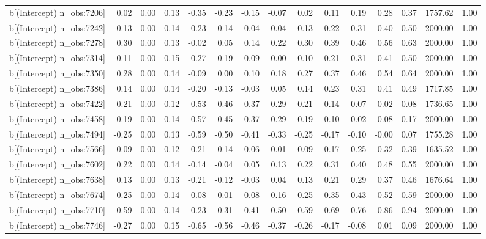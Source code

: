 \begin{table}[ht]
\begin{tabular}{rrrrrrrrrrrrrrr}
  b[(Intercept) n\_obs:7206] & 0.02 & 0.00 & 0.13 & -0.35 & -0.23 & -0.15 & -0.07 & 0.02 & 0.11 & 0.19 & 0.28 & 0.37 & 1757.62 & 1.00 \\ 
  b[(Intercept) n\_obs:7242] & 0.13 & 0.00 & 0.14 & -0.23 & -0.14 & -0.04 & 0.04 & 0.13 & 0.22 & 0.31 & 0.40 & 0.50 & 2000.00 & 1.00 \\ 
  b[(Intercept) n\_obs:7278] & 0.30 & 0.00 & 0.13 & -0.02 & 0.05 & 0.14 & 0.22 & 0.30 & 0.39 & 0.46 & 0.56 & 0.63 & 2000.00 & 1.00 \\ 
  b[(Intercept) n\_obs:7314] & 0.11 & 0.00 & 0.15 & -0.27 & -0.19 & -0.09 & 0.00 & 0.10 & 0.21 & 0.31 & 0.41 & 0.50 & 2000.00 & 1.00 \\ 
  b[(Intercept) n\_obs:7350] & 0.28 & 0.00 & 0.14 & -0.09 & 0.00 & 0.10 & 0.18 & 0.27 & 0.37 & 0.46 & 0.54 & 0.64 & 2000.00 & 1.00 \\ 
  b[(Intercept) n\_obs:7386] & 0.14 & 0.00 & 0.14 & -0.20 & -0.13 & -0.03 & 0.05 & 0.14 & 0.23 & 0.31 & 0.41 & 0.49 & 1717.85 & 1.00 \\ 
  b[(Intercept) n\_obs:7422] & -0.21 & 0.00 & 0.12 & -0.53 & -0.46 & -0.37 & -0.29 & -0.21 & -0.14 & -0.07 & 0.02 & 0.08 & 1736.65 & 1.00 \\ 
  b[(Intercept) n\_obs:7458] & -0.19 & 0.00 & 0.14 & -0.57 & -0.45 & -0.37 & -0.29 & -0.19 & -0.10 & -0.02 & 0.08 & 0.17 & 2000.00 & 1.00 \\ 
  b[(Intercept) n\_obs:7494] & -0.25 & 0.00 & 0.13 & -0.59 & -0.50 & -0.41 & -0.33 & -0.25 & -0.17 & -0.10 & -0.00 & 0.07 & 1755.28 & 1.00 \\ 
  b[(Intercept) n\_obs:7566] & 0.09 & 0.00 & 0.12 & -0.21 & -0.14 & -0.06 & 0.01 & 0.09 & 0.17 & 0.25 & 0.32 & 0.39 & 1635.52 & 1.00 \\ 
  b[(Intercept) n\_obs:7602] & 0.22 & 0.00 & 0.14 & -0.14 & -0.04 & 0.05 & 0.13 & 0.22 & 0.31 & 0.40 & 0.48 & 0.55 & 2000.00 & 1.00 \\ 
  b[(Intercept) n\_obs:7638] & 0.13 & 0.00 & 0.13 & -0.21 & -0.12 & -0.03 & 0.04 & 0.13 & 0.21 & 0.29 & 0.37 & 0.46 & 1676.64 & 1.00 \\ 
  b[(Intercept) n\_obs:7674] & 0.25 & 0.00 & 0.14 & -0.08 & -0.01 & 0.08 & 0.16 & 0.25 & 0.35 & 0.43 & 0.52 & 0.59 & 2000.00 & 1.00 \\ 
  b[(Intercept) n\_obs:7710] & 0.59 & 0.00 & 0.14 & 0.23 & 0.31 & 0.41 & 0.50 & 0.59 & 0.69 & 0.76 & 0.86 & 0.94 & 2000.00 & 1.00 \\ 
  b[(Intercept) n\_obs:7746] & -0.27 & 0.00 & 0.15 & -0.65 & -0.56 & -0.46 & -0.37 & -0.26 & -0.17 & -0.08 & 0.01 & 0.09 & 2000.00 & 1.00 \\ 

\end{tabular}
\end{table}
